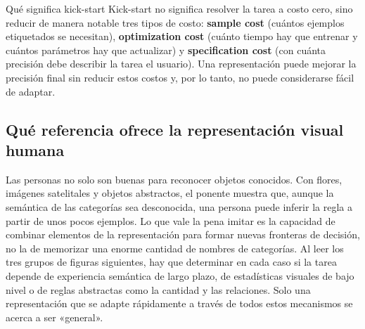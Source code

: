 
\begin{importantbox}{Qué significa kick-start}
Kick-start no significa resolver la tarea a costo cero, sino reducir de manera notable tres tipos de costo: \textbf{sample cost} (cuántos ejemplos etiquetados se necesitan), \textbf{optimization cost} (cuánto tiempo hay que entrenar y cuántos parámetros hay que actualizar) y \textbf{specification cost} (con cuánta precisión debe describir la tarea el usuario). Una representación puede mejorar la precisión final sin reducir estos costos y, por lo tanto, no puede considerarse fácil de adaptar.
\end{importantbox}


\subsection{Qué referencia ofrece la representación visual humana}

Las personas no solo son buenas para reconocer objetos conocidos. Con flores, imágenes satelitales y objetos abstractos, el ponente muestra que, aunque la semántica de las categorías sea desconocida, una persona puede inferir la regla a partir de unos pocos ejemplos. Lo que vale la pena imitar es la capacidad de combinar elementos de la representación para formar nuevas fronteras de decisión, no la de memorizar una enorme cantidad de nombres de categorías. Al leer los tres grupos de figuras siguientes, hay que determinar en cada caso si la tarea depende de experiencia semántica de largo plazo, de estadísticas visuales de bajo nivel o de reglas abstractas como la cantidad y las relaciones. Solo una representación que se adapte rápidamente a través de todos estos mecanismos se acerca a ser «general».


